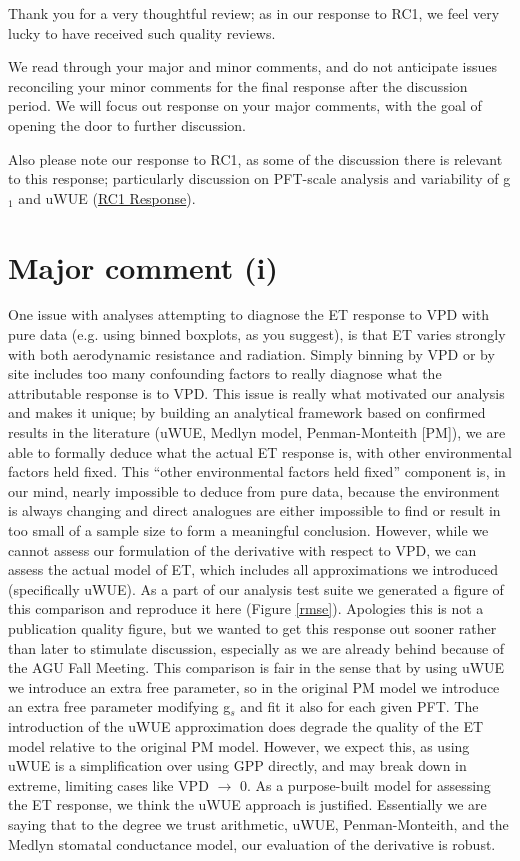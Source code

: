 \documentclass[12pt]{article}
\begin{document}
Thank you for a very thoughtful review; as in our response to RC1, we
feel very lucky to have received such quality reviews.

We read through your major and minor comments, and do not anticipate
issues reconciling your minor comments for the final response after
the discussion period. We will focus out response on your major
comments, with the goal of opening the door to further discussion.

Also please note our response to RC1, as some of the discussion there
is relevant to this response; particularly discussion on PFT-scale
analysis and variability of g$_1$ and uWUE
(\href{https://editor.copernicus.org/index.php/hess-2018-553-AC1.pdf?_mdl=msover_md&_jrl=13&_lcm=oc108lcm109w&_acm=get_comm_file&_ms=72556&c=153745&salt=17166479111051651323}{RC1
Response}).

\section{Major comment (i)}
\label{i}
One issue with analyses attempting to diagnose the ET response to VPD
with pure data (e.g. using binned boxplots, as you suggest), is that
ET varies strongly with both aerodynamic resistance and
radiation. Simply binning by VPD or by site includes too many
confounding factors to really diagnose what the attributable response
is to VPD. This issue is really what motivated our analysis and makes
it unique; by building an analytical framework based on confirmed
results in the literature (uWUE, Medlyn model, Penman-Monteith [PM]), we are
able to formally deduce what the actual ET response is, with other
environmental factors held fixed. This ``other environmental factors
held fixed'' component is, in our mind, nearly impossible to
deduce from pure data, because the environment is always changing and
direct analogues are either impossible to find or result in too small
of a sample size to form a meaningful conclusion. However, while we
cannot assess our formulation of the derivative with respect to VPD,
we can assess the actual model of ET, which includes all
approximations we introduced (specifically uWUE). As a part of our
analysis test suite we generated a figure of this comparison and
reproduce it here (Figure \ref{rmse}). Apologies this is not a
publication quality figure, but we wanted to get this response out
sooner rather than later to stimulate discussion, especially as we are
already behind because of the AGU Fall Meeting. This comparison is
fair in the sense that by using uWUE we introduce an extra free
parameter, so in the original PM model we introduce an extra free
parameter modifying g$_s$ and fit it also for each given PFT. The
introduction of the uWUE approximation does degrade the quality of the
ET model relative to the original PM model. However, we expect this,
as using uWUE is a simplification over using GPP directly, and may
break down in extreme, limiting cases like VPD $\to$ 0. As
a purpose-built model for assessing the ET response, we think the uWUE
approach is justified. Essentially we are saying that to the degree we
trust arithmetic, uWUE, Penman-Monteith, and the Medlyn stomatal
conductance model, our evaluation of the derivative is robust.
\end{document}
